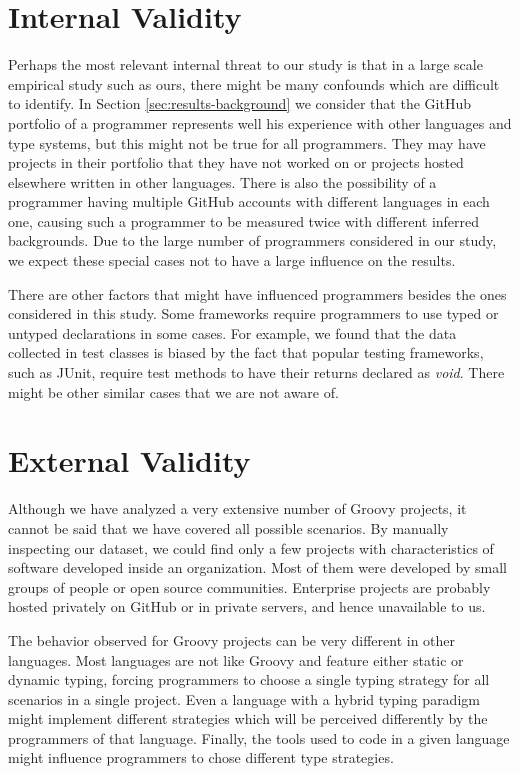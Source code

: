 \documentclass[msc]{ppgccufmg}
\begin{document}
\section*{Internal Validity}
Perhaps the most relevant internal threat to our study is that in a large scale empirical study such as ours, there might be many confounds which are difficult to identify.
In Section \ref{sec:results-background} we consider that the GitHub portfolio of a programmer represents well his experience with other languages and type systems, but this might not be true for all programmers.
They may have projects in their portfolio that they have not worked on or projects hosted elsewhere written in other languages.
There is also the possibility of a programmer having multiple GitHub accounts with different languages in each one, causing such a programmer to be measured twice with different inferred backgrounds.
Due to the large number of programmers considered in our study, we expect these special cases not to have a large influence on the results.

There are other factors that might have influenced programmers besides the ones considered in this study.
Some frameworks require programmers to use typed or untyped declarations in some cases.
For example, we found that the data collected in test classes is biased by the fact that popular testing frameworks, such as JUnit, require test methods to have their returns declared as \emph{void}.
There might be other similar cases that we are not aware of.

\section*{External Validity}
Although we have analyzed a very extensive number of Groovy projects, it cannot be said that we have covered all possible scenarios.
By manually inspecting our dataset, we could find only a few projects with characteristics of software developed inside an organization.
Most of them were developed by small groups of people or open source communities.
Enterprise projects are probably hosted privately on GitHub or in private servers, and hence unavailable to us.

The behavior observed for Groovy projects can be very different in other languages.
Most languages are not like Groovy and feature either static or dynamic typing, forcing programmers to choose a single typing strategy for all scenarios in a single project.
Even a language with a hybrid typing paradigm might implement different strategies which will be perceived differently by the programmers of that language.
Finally, the tools used to code in a given language might influence programmers to chose different type strategies.
\end{document}

